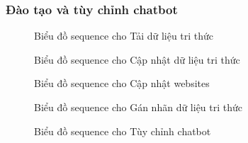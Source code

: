\subsubsection{Đào tạo và tùy chỉnh chatbot}
\begin{figure}[H]
	\centering
	
	\vspace{0.5cm}
	\caption{Biểu đồ sequence cho Tải dữ liệu tri thức}
	\label{fig:enter-label}
\end{figure}
\begin{figure}[H]
	\centering
	
	\vspace{0.5cm}
	\caption{Biểu đồ sequence cho Cập nhật dữ liệu tri thức}
	\label{fig:enter-label}
\end{figure}
\begin{figure}[H]
	\centering
	
	\vspace{0.5cm}
	\caption{Biểu đồ sequence cho Cập nhật websites}
	\label{fig:enter-label}
\end{figure}
\begin{figure}[H]
	\centering
	
	\vspace{0.5cm}
	\caption{Biểu đồ sequence cho Gán nhãn dữ liệu tri thức}
	\label{fig:enter-label}
\end{figure}
\begin{figure}[H]
	\centering
	
	\vspace{0.5cm}
	\caption{Biểu đồ sequence cho Tùy chỉnh chatbot}
	\label{fig:enter-label}
\end{figure}
